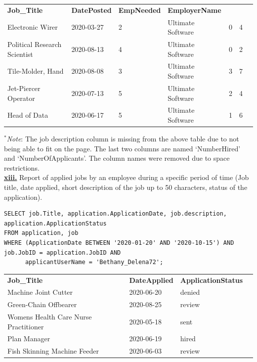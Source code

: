 \documentclass[11pt]{article}
\begin{document}
\begin{table}[!htbp]
\begin{tabular}{lllllll}
\textbf{Job\_Title}  & \textbf{DatePosted}  & \textbf{EmpNeeded} & \textbf{EmployerName} &  & \\
Electronic Wirer              & 2020-03-27 & 2 & Ultimate Software & 0 & 4 \\
Political Research Scientist  & 2020-08-13 & 4 & Ultimate Software & 0 & 2 \\
Tile-Molder, Hand             & 2020-08-08 & 3 & Ultimate Software & 3 & 7 \\
Jet-Piercer Operator          & 2020-07-13 & 5 & Ultimate Software & 2 & 4 \\
Head of Data                  & 2020-06-17 & 5 & Ultimate Software & 1 & 6 \\
\end{tabular}
\end{table}

$^{*}$\textit{Note}: The job description column is missing from the above table due to not being able to fit on the page. The last two columns are named `NumberHired' and `NumberOfApplicants'. The column names were removed due to space restrictions.\\

\underline{\textbf{xiii.}} Report of applied jobs by an employee during a specific period of time
(Job title, date applied, short description of the job up to 50 characters,
status of the application).

\begin{verbatim}
SELECT job.Title, application.ApplicationDate, job.description, 
application.ApplicationStatus
FROM application, job
WHERE (ApplicationDate BETWEEN '2020-01-20' AND '2020-10-15') AND 
job.JobID = application.JobID AND
      applicantUserName = 'Bethany_Delena72';
\end{verbatim}

\begin{table}[!htbp]
\begin{tabular}{llll}
\textbf{Job\_Title}                 & \textbf{DateApplied} & \textbf{ApplicationStatus} \\
Machine Joint Cutter                  & 2020-06-20 & denied \\
Green-Chain Offbearer                 & 2020-08-25 & review \\
Womens Health Care Nurse Practitioner & 2020-05-18 & sent   \\
Plan Manager                          & 2020-06-19 & hired  \\
Fish Skinning Machine Feeder          & 2020-06-03 & review \\
\end{tabular}
\end{table}
\end{document}
